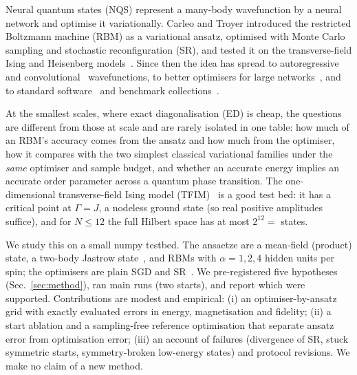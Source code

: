 Neural quantum states (NQS) represent a many-body wavefunction by a neural network and optimise it variationally. Carleo and Troyer introduced the restricted Boltzmann machine (RBM) as a variational ansatz, optimised with Monte Carlo sampling and stochastic reconfiguration (SR), and tested it on the transverse-field Ising and Heisenberg models~\cite{carleo2016solving}. Since then the idea has spread to autoregressive~\cite{sharir2019deep,hibatallah2020recurrent} and convolutional~\cite{choo2019study} wavefunctions, to better optimisers for large networks~\cite{chen2023empowering}, and to standard software~\cite{vicentini2021netket} and benchmark collections~\cite{wu2023variational}.

At the smallest scales, where exact diagonalisation (ED) is cheap, the questions are different from those at scale and are rarely isolated in one table: how much of an RBM's accuracy comes from the ansatz and how much from the optimiser, how it compares with the two simplest classical variational families under the \emph{same} optimiser and sample budget, and whether an accurate energy implies an accurate order parameter across a quantum phase transition. The one-dimensional transverse-field Ising model (TFIM)~\cite{pfeuty1970one} is a good test bed: it has a critical point at $\Gamma=J$, a nodeless ground state (so real positive amplitudes suffice), and for $N\le 12$ the full Hilbert space has at most $2^{12}=$  states.

We study this on a small numpy testbed. The ansaetze are a mean-field (product) state, a two-body Jastrow state~\cite{jastrow1955many}, and RBMs with $\alpha=1,2,4$ hidden units per spin; the optimisers are plain SGD and SR~\cite{sorella1998green}. We pre-registered five hypotheses (Sec.~\ref{sec:method}), ran  main runs (two starts), and report which were supported. Contributions are modest and empirical: (i) an optimiser-by-ansatz grid with exactly evaluated errors in energy, magnetisation and fidelity; (ii) a start ablation and a sampling-free reference optimisation that separate ansatz error from optimisation error; (iii) an account of failures (divergence of SR, stuck symmetric starts, symmetry-broken low-energy states) and protocol revisions. We make no claim of a new method.
